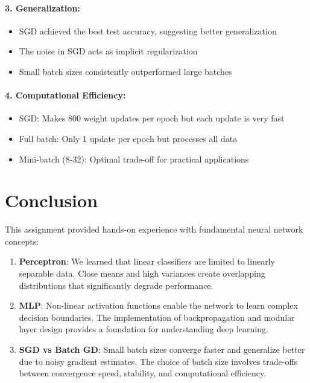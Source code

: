 \documentclass[11pt,a4paper]{article}
\begin{document}
\paragraph{3. Generalization:}
\begin{itemize}
    \item SGD achieved the best test accuracy, suggesting better generalization
    \item The noise in SGD acts as implicit regularization
    \item Small batch sizes consistently outperformed large batches
\end{itemize}

\paragraph{4. Computational Efficiency:}
\begin{itemize}
    \item SGD: Makes 800 weight updates per epoch but each update is very fast
    \item Full batch: Only 1 update per epoch but processes all data
    \item Mini-batch (8-32): Optimal trade-off for practical applications
\end{itemize}



\newpage
\section{Conclusion}

This assignment provided hands-on experience with fundamental neural network concepts:

\begin{enumerate}
    \item \textbf{Perceptron}: We learned that linear classifiers are limited to linearly separable data. Close means and high variances create overlapping distributions that significantly degrade performance.

    \item \textbf{MLP}: Non-linear activation functions enable the network to learn complex decision boundaries. The implementation of backpropagation and modular layer design provides a foundation for understanding deep learning.

    \item \textbf{SGD vs Batch GD}: Small batch sizes converge faster and generalize better due to noisy gradient estimates. The choice of batch size involves trade-offs between convergence speed, stability, and computational efficiency.
\end{enumerate}
\end{document}
